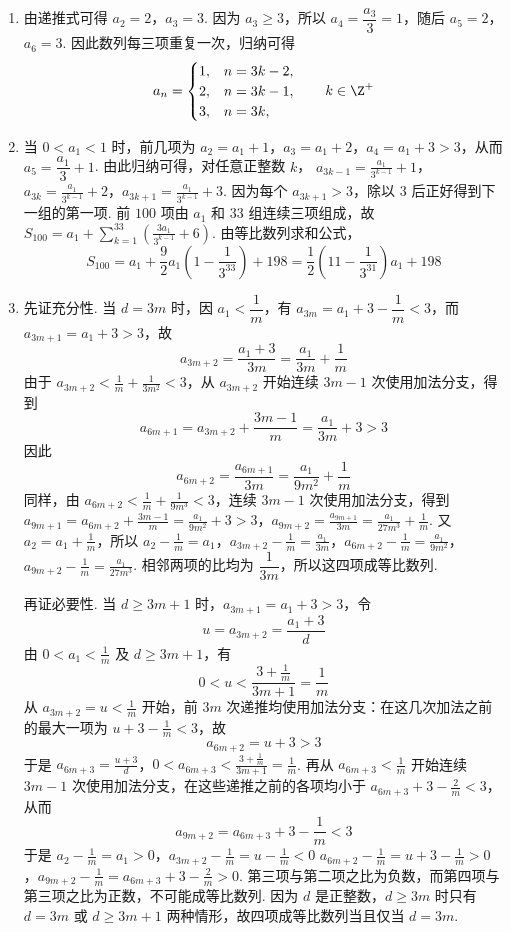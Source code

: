 \begin{solution}
\begin{enumerate}
\item 由递推式可得 \(a_{2}=2\)，\(a_{3}=3\). 因为 \(a_{3}\geqslant3\)，所以 \(a_{4}=\dfrac{a_{3}}{3}=1\)，随后 \(a_{5}=2\)，\(a_{6}=3\). 因此数列每三项重复一次，归纳可得
\[
a_n=\begin{cases}
1,&n=3k-2,\\
2,&n=3k-1,\\
3,&n=3k,
\end{cases}\qquad k\in\Z^+
\]
\item 当 \(0<a_{1}<1\) 时，前几项为 \(a_{2}=a_{1}+1\)，\(a_{3}=a_{1}+2\)，\(a_{4}=a_{1}+3>3\)，从而 \(a_{5}=\dfrac{a_{1}}{3}+1\). 由此归纳可得，对任意正整数 \(k\)，
\(a_{3k-1}=\frac{a_{1}}{3^{k-1}}+1\)，\(a_{3k}=\frac{a_{1}}{3^{k-1}}+2\)，\(a_{3k+1}=\frac{a_{1}}{3^{k-1}}+3\).
因为每个 \(a_{3k+1}>3\)，除以 \(3\) 后正好得到下一组的第一项. 前 \(100\) 项由 \(a_{1}\) 和 \(33\) 组连续三项组成，故
\(S_{100}=a_{1}+\sum_{k=1}^{33}\left(\frac{3a_{1}}{3^{k-1}}+6\right)\).
由等比数列求和公式，
\[
S_{100}=a_{1}+\frac{9}{2}a_{1}\left(1-\frac{1}{3^{33}}\right)+198
=\frac{1}{2}\left(11-\frac{1}{3^{31}}\right)a_{1}+198
\]
\item 先证充分性. 当 \(d=3m\) 时，因 \(a_{1}<\dfrac{1}{m}\)，有 \(a_{3m}=a_{1}+3-\dfrac{1}{m}<3\)，而 \(a_{3m+1}=a_{1}+3>3\)，故
\[
a_{3m+2}=\frac{a_{1}+3}{3m}=\frac{a_{1}}{3m}+\frac{1}{m}
\]
由于 \(a_{3m+2}<\frac{1}{m}+\frac{1}{3m^{2}}<3\)，从 \(a_{3m+2}\) 开始连续 \(3m-1\) 次使用加法分支，得到
\[
a_{6m+1}=a_{3m+2}+\frac{3m-1}{m}=\frac{a_{1}}{3m}+3>3
\]
因此
\[
a_{6m+2}=\frac{a_{6m+1}}{3m}=\frac{a_{1}}{9m^{2}}+\frac{1}{m}
\]
同样，由 \(a_{6m+2}<\frac{1}{m}+\frac{1}{9m^{3}}<3\)，连续 \(3m-1\) 次使用加法分支，得到
\(a_{9m+1}=a_{6m+2}+\frac{3m-1}{m}=\frac{a_{1}}{9m^{2}}+3>3\)，\(a_{9m+2}=\frac{a_{9m+1}}{3m}=\frac{a_{1}}{27m^{3}}+\frac{1}{m}\).
又 \(a_{2}=a_{1}+\frac{1}{m}\)，所以
\(a_{2}-\frac{1}{m}=a_{1}\)，\(a_{3m+2}-\frac{1}{m}=\frac{a_{1}}{3m}\)，\(a_{6m+2}-\frac{1}{m}=\frac{a_{1}}{9m^{2}}\)，\(a_{9m+2}-\frac{1}{m}=\frac{a_{1}}{27m^{3}}\).
相邻两项的比均为 \(\dfrac{1}{3m}\)，所以这四项成等比数列.

再证必要性. 当 \(d\geqslant3m+1\) 时，\(a_{3m+1}=a_{1}+3>3\)，令
\[
u=a_{3m+2}=\frac{a_{1}+3}{d}
\]
由 \(0<a_{1}<\frac1m\) 及 \(d\geqslant3m+1\)，有
\[
0<u<\frac{3+\frac{1}{m}}{3m+1}=\frac1m
\]
从 \(a_{3m+2}=u<\frac1m\) 开始，前 \(3m\) 次递推均使用加法分支：在这几次加法之前的最大一项为 \(u+3-\frac1m<3\)，故
\[
a_{6m+2}=u+3>3
\]
于是
\(a_{6m+3}=\frac{u+3}{d}\)，\(0<a_{6m+3}<\frac{3+\frac{1}{m}}{3m+1}=\frac1m\).
再从 \(a_{6m+3}<\frac1m\) 开始连续 \(3m-1\) 次使用加法分支，在这些递推之前的各项均小于 \(a_{6m+3}+3-\frac2m<3\)，从而
\[
a_{9m+2}=a_{6m+3}+3-\frac1m<3
\]
于是
\(a_{2}-\frac1m=a_{1}>0\)，\(a_{3m+2}-\frac1m=u-\frac1m<0\)
\(a_{6m+2}-\frac1m=u+3-\frac1m>0\)，\(a_{9m+2}-\frac1m=a_{6m+3}+3-\frac2m>0\).
第三项与第二项之比为负数，而第四项与第三项之比为正数，不可能成等比数列. 因为 \(d\) 是正整数，\(d\geqslant3m\) 时只有 \(d=3m\) 或 \(d\geqslant3m+1\) 两种情形，故四项成等比数列当且仅当 \(d=3m\).
\end{enumerate}
\end{solution}
